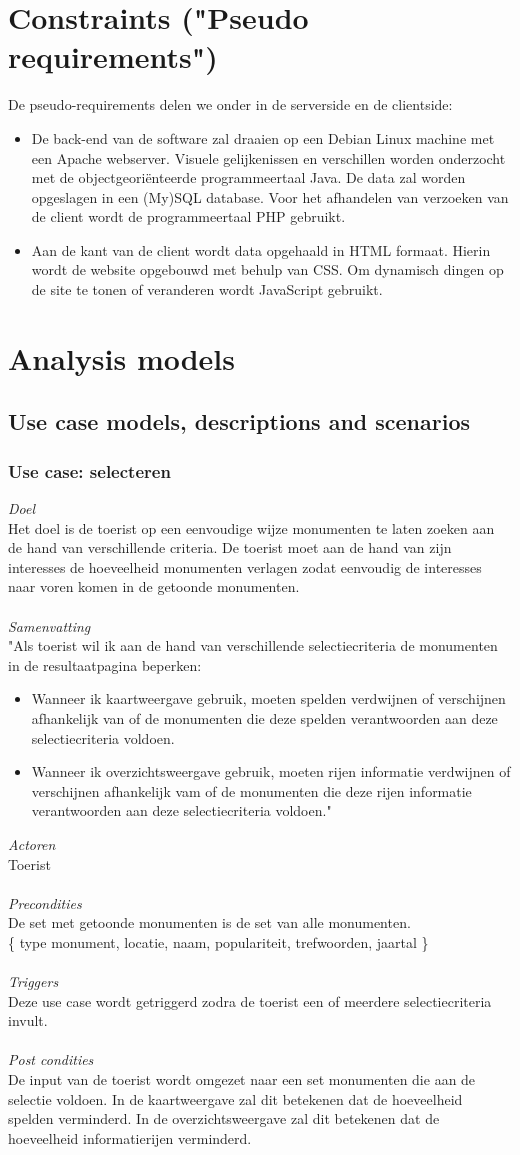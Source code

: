 \documentclass[a4paper,10pt]{article}
\newcommand{\rsection}[1]{
\section{#1}\label{sec:#1}
}
\newcommand{\rsubsection}[1]{
\subsection{#1}\label{sec:sub:#1}
}
\newcommand{\rsubsubsection}[1]{
\subsubsection{#1}\label{sec:sub:sub:#1}
}
\begin{document}
		\clearpage
		\rsection{Constraints ("Pseudo requirements")}
			De pseudo-requirements delen we onder in de serverside en de clientside:
			\begin{itemize}
				\item De back-end van de software zal draaien op een Debian Linux machine met een Apache webserver. Visuele gelijkenissen en verschillen worden onderzocht met de objectgeori\"enteerde programmeertaal Java. De data zal worden opgeslagen in een (My)SQL database. Voor het afhandelen van verzoeken van de client wordt de programmeertaal PHP gebruikt.
				\item Aan de kant van de client wordt data opgehaald in HTML formaat. Hierin wordt de website opgebouwd met behulp van CSS. Om dynamisch dingen op de site te tonen of veranderen wordt JavaScript gebruikt.
			\end{itemize}
		
		\clearpage
		\rsection{Analysis models}
		\rsubsection{Use case models, descriptions and scenarios}
			\rsubsubsection{Use case: selecteren}
			\textit{Doel}\\
			Het doel is de toerist op een eenvoudige wijze monumenten te laten zoeken aan de hand van verschillende criteria. De toerist moet aan de hand van zijn interesses de hoeveelheid monumenten verlagen zodat eenvoudig de interesses naar voren komen in de getoonde monumenten.\\ \\
			\textit{Samenvatting}\\
			"Als toerist wil ik aan de hand van verschillende selectiecriteria de monumenten in de resultaatpagina beperken:
			\begin{itemize}
				\item Wanneer ik kaartweergave gebruik, moeten spelden verdwijnen of verschijnen afhankelijk van of de monumenten die deze spelden verantwoorden aan deze selectiecriteria voldoen.
				\item Wanneer ik overzichtsweergave gebruik, moeten rijen informatie verdwijnen of verschijnen afhankelijk vam of de monumenten die deze rijen informatie verantwoorden aan deze selectiecriteria voldoen."
			\end{itemize}
			\textit{Actoren}\\
			Toerist\\ \\
			\textit{Precondities}\\
			De set met getoonde monumenten is de set van alle monumenten.\\
			\{ type monument, locatie, naam, populariteit, trefwoorden, jaartal \} \\ \\
			\textit{Triggers}\\
			Deze use case wordt getriggerd zodra de toerist een of meerdere selectiecriteria invult.\\ \\
			\textit{Post condities}\\			
			De input van de toerist wordt omgezet naar een set monumenten die aan de selectie voldoen. In de kaartweergave zal dit betekenen dat de hoeveelheid spelden verminderd. In de overzichtsweergave zal dit betekenen dat de hoeveelheid informatierijen verminderd.		
			
\end{document}
